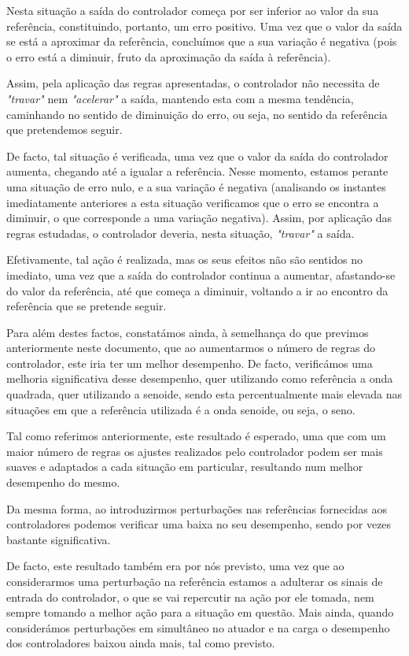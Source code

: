 \documentclass{article}
\begin{document}
Nesta situação a saída do controlador começa por ser inferior ao valor da sua referência, constituindo, portanto, um erro positivo. Uma vez que o valor da saída se está a aproximar da referência, concluímos que a sua variação é negativa (pois o erro está a diminuir, fruto da aproximação da saída à referência).

Assim, pela aplicação das regras apresentadas, o controlador não necessita de \emph{"travar"} nem \emph{"acelerar"} a saída, mantendo esta com a mesma tendência, caminhando no sentido de diminuição do erro, ou seja, no sentido da referência que pretendemos seguir.

De facto, tal situação é verificada, uma vez que o valor da saída do controlador aumenta, chegando até a igualar a referência. Nesse momento, estamos perante uma situação de erro nulo, e a sua variação é negativa (analisando os instantes imediatamente anteriores a esta situação verificamos que o erro se encontra a diminuir, o que corresponde a uma variação negativa). Assim, por aplicação das regras estudadas, o controlador deveria, nesta situação, \emph{"travar"} a saída.

Efetivamente, tal ação é realizada, mas os seus efeitos não são sentidos no imediato, uma vez que a saída do controlador continua a aumentar, afastando-se do valor da referência, até que começa a diminuir, voltando a ir ao encontro da referência que se pretende seguir.

Para além destes factos, constatámos ainda, à semelhança do que previmos anteriormente neste documento, que ao aumentarmos o número de regras do controlador, este iria ter um melhor desempenho. De facto, verificámos uma melhoria significativa desse desempenho, quer utilizando como referência a onda quadrada, quer utilizando a senoide, sendo esta percentualmente mais elevada nas situações em que a referência utilizada é a onda senoide, ou seja, o seno.

Tal como referimos anteriormente, este resultado é esperado, uma que com um maior número de regras os ajustes realizados pelo controlador podem ser mais suaves e adaptados a cada situação em particular, resultando num melhor desempenho do mesmo.

Da mesma forma, ao introduzirmos perturbações nas referências fornecidas aos controladores podemos verificar uma baixa no seu desempenho, sendo por vezes bastante significativa.

De facto, este resultado também era por nós previsto, uma vez que ao considerarmos uma perturbação na referência estamos a adulterar os sinais de entrada do controlador, o que se vai repercutir na ação por ele tomada, nem sempre tomando a melhor ação para a situação em questão. Mais ainda, quando considerámos perturbações em simultâneo no atuador e na carga o desempenho dos controladores baixou ainda mais, tal como previsto.
\end{document}
